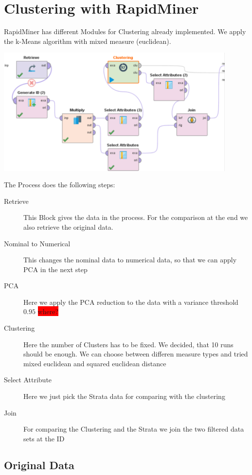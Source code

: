 
\section{Clustering with RapidMiner}

RapidMiner has different Modules for Clustering already implemented. We apply the k-Means algorithm with mixed measure (euclidean).

\includegraphics[width=0.9\textwidth]{../Miriam-RapidMiner/ClusteringRapid.PNG}


The Process does the following steps:
\begin{description}
	\item[Retrieve] This Block gives the data in the process. For the comparison at the end we also retrieve the original data.
	\item[Nominal to Numerical] This changes the nominal data to numerical data, so that we can apply PCA in the next step
	\item[PCA] Here we apply the PCA reduction to the data with a variance threshold $0.95$ \colorbox{red}{where?}
	\item[Clustering] Here the number of Clusters has to be fixed. We decided, that 10 runs should be enough. We can choose between differen measure types and tried mixed euclidean and squared euclidean distance
	\item[Select Attribute] Here we just pick the Strata data for comparing with the clustering
	\item[Join] For comparing the Clustering and the Strata we join the two filtered data sets at the ID
\end{description}

\subsection{Original Data}

